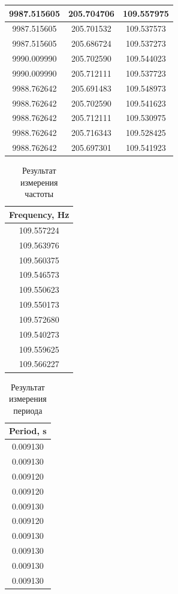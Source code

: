 \documentclass[a4paper,14pt]{article}
\begin{document}
\begin{longtable}[c]{|c|c|c|}
	9987.515605       & 205.704706           & 109.557975        \\ \hline
	9987.515605       & 205.701532           & 109.537573        \\ \hline
	9987.515605       & 205.686724           & 109.537273        \\ \hline
	9990.009990       & 205.702590           & 109.544023        \\ \hline
	9990.009990       & 205.712111           & 109.537723        \\ \hline
	9988.762642       & 205.691483           & 109.548973        \\ \hline
	9988.762642       & 205.702590           & 109.541623        \\ \hline
	9988.762642       & 205.712111           & 109.530975        \\ \hline
	9988.762642       & 205.716343           & 109.528425        \\ \hline
	9988.762642       & 205.697301           & 109.541923        \\ \hline
\end{longtable}

\begin{table}[H]
	\centering
	\caption{Результат измерения частоты}
	\label{tab:dfm_scan_freq}
	\begin{tabular}{|c|}
		\hline
		Frequency, Hz \\ \hline
		 109.557224   \\ \hline
		 109.563976   \\ \hline
		 109.560375   \\ \hline
		 109.546573   \\ \hline
		 109.550623   \\ \hline
		 109.550173   \\ \hline
		 109.572680   \\ \hline
		 109.540273   \\ \hline
		 109.559625   \\ \hline
		 109.566227   \\ \hline
	\end{tabular}
\end{table}

\begin{table}[H]
	\centering
	\caption{Результат измерения периода}
	\label{tab:dfm_scan_period}
	\begin{tabular}{|c|}
		\hline
		Period, s \\ \hline
		0.009130  \\ \hline
		0.009130  \\ \hline
		0.009120  \\ \hline
		0.009120  \\ \hline
		0.009130  \\ \hline
		0.009120  \\ \hline
		0.009130  \\ \hline
		0.009130  \\ \hline
		0.009130  \\ \hline
		0.009130  \\ \hline
	\end{tabular}
\end{table}
\end{document}
